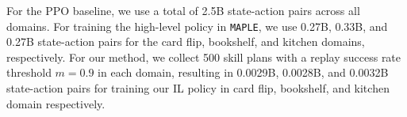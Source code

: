 For the PPO baseline, we use a total of 2.5B state-action pairs across all domains. For training the high-level policy in \texttt{MAPLE}, we use 0.27B, 0.33B, and 0.27B state-action pairs for the card flip, bookshelf, and kitchen domains, respectively. For our method, we collect 500 skill plans with a replay success rate threshold \( m = 0.9 \) in each domain, resulting in 0.0029B, 0.0028B, and 0.0032B state-action pairs for training our IL policy in card flip, bookshelf, and kitchen domain respectively.



